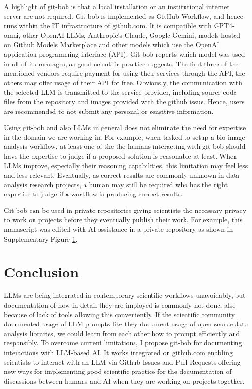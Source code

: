 \documentclass{ecai}
\begin{document}
A highlight of git-bob is that a local installation or an institutional internet server are not required. Git-bob is implemented as GitHub Workflow, and hence runs within the IT infrastructure of github.com. It is compatible with GPT4-omni, other OpenAI LLMs, Anthropic's Claude, Google Gemini, models hosted on Github Models Marketplace and other models which use the OpenAI application programming interface (API). Git-bob reports which model was used in all of its messages, as good scientific practice suggests. The first three of the mentioned vendors require payment for using their services through the API, the others may offer usage of their API for free. Obviously, the communication with the selected LLM is transmitted to the service provider, including source code files from the repository and images provided with the github issue. Hence, users are recommended to not submit any personal or sensitive information. 

Using git-bob and also LLMs in general does not eliminate the need for expertise in the domain we are working in. For example, when tasked to setup a bio-image analysis workflow, at least one of the the humans interacting with git-bob should have the expertise to judge if a proposed solution is reasonable at least. When LLMs improve, especially their reasoning capabilities, this limitation may feel less and less relevant. Eventually, as correct results are commonly unknown in data analysis research projects, a human  may still be required who has the right expertise to judge if a workflow is producing correct results.

Git-bob can be used in private repositories giving scientists the necessary privacy to work on projects before they eventually publish their work. For example, this manuscript was edited with AI-assistance in a private repository as shown in Supplementary Figure \ref{}.


\section{Conclusion}

LLMs are being integrated in contemporary scientific workflows unavoidably, but documentation of how in detail they are imployed is commonly not done, also because of lack of tools allowing this conveniently. If the scientific community documented usage of LLM prompts like they document usage of open source data analysis libraries, we could learn from each other how to prompt efficiently and responsibly. To overcome current limitations, I propose git-bob for documenting interactions with LLM-based AI. It works integrated on github.com enabling scientists to interact with an LLM via Github Issues and Pull-Requests offering new ways for implementing good scientific practice for the documentation of discussions between humans and AI when they are working on projects together.
\end{document}
